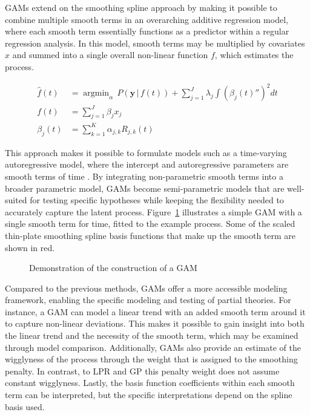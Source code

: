 \documentclass[man, floatsintext]{apa7}
\DeclareMathOperator*{\argmin}{argmin}
\begin{document}
GAMs extend on the smoothing spline approach by making it possible to combine
multiple smooth terms in an overarching additive regression model, where each
smooth term essentially functions as a predictor within a regular regression
analysis. In this model, smooth terms may be multiplied by covariates $x$ and
summed into a single overall non-linear function $f$, which estimates the
process.

\begin{equation}
  \begin{aligned}
    \hat{f}(t) & = \argmin_\alpha \, P(\textbf{y} \, | \, f(t)) +
    \sum_{j = 1}^{J} \lambda_j \int {(\beta_j(t)'')}^2 dt         \\
    f(t)       & = \sum_{j = 1}^{J} \beta_j x_j                   \\
    \beta_j(t) & = \sum^K_{k = 1} \alpha_{j,k} R_{j, k}(t)
  \end{aligned}
\end{equation}

\noindent This approach makes it possible to formulate models such
as a time-varying autoregressive model, where the intercept and autoregressive
parameters are smooth terms of time \parencite{bringmann_changing_2017,
  bringmann_modeling_2015}. By integrating non-parametric smooth terms into a
broader parametric model, GAMs become semi-parametric models that are
well-suited for testing specific hypotheses while keeping the flexibility
needed to accurately capture the latent process. Figure~\ref{fig:gam_dem}
illustrates a simple GAM with a single smooth term for time, fitted to the
example process. Some of the scaled thin-plate smoothing spline basis functions
that make up the smooth term are shown in red.

\begin{figure}[!ht]
  \caption{Demonstration of the construction of a GAM}
  \label{fig:gam_dem}
\end{figure}

Compared to the previous methods, GAMs offer a more accessible modeling
framework, enabling the specific modeling and testing of partial theories. For
instance, a GAM can model a linear trend with an added smooth term around it to
capture non-linear deviations. This makes it possible to gain insight into both
the linear trend and the necessity of the smooth term, which may be examined
through model comparison. Additionally, GAMs also provide an estimate of the
wigglyness of the process through the weight that is assigned to the smoothing
penalty. In contrast, to LPR and GP this penalty weight does not assume
constant wigglyness. Lastly, the basis function coefficients within each smooth
term can be interpreted, but the specific interpretations depend on the spline
basis used.
\end{document}

